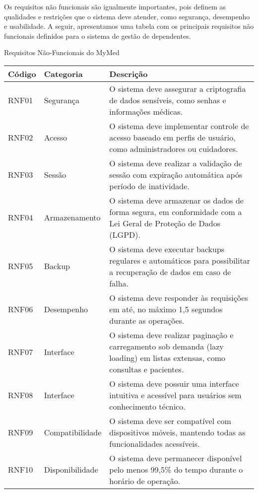 Os requisitos não funcionais são igualmente importantes, pois definem as qualidades e restrições que o sistema deve atender, como segurança, desempenho e usabilidade. A seguir, apresentamos uma tabela com os principais requisitos não funcionais definidos para o sistema de gestão de dependentes.

\begin{quadro}
\caption{Requisitos Não-Funcionais do MyMed}
\begin{tabularx}{\textwidth}{|l|l|X|}
\hline
\textbf{Código} & \textbf{Categoria} & \textbf{Descrição} \\ \hline
RNF01 & Segurança & O sistema deve assegurar a criptografia de dados sensíveis, como senhas e informações médicas. \\ \hline
RNF02 & Acesso & O sistema deve implementar controle de acesso baseado em perfis de usuário, como administradores ou cuidadores. \\ \hline
RNF03 & Sessão & O sistema deve realizar a validação de sessão com expiração automática após período de inatividade. \\ \hline
RNF04 & Armazenamento & O sistema deve armazenar os dados de forma segura, em conformidade com a Lei Geral de Proteção de Dados (LGPD). \\ \hline
RNF05 & Backup & O sistema deve executar backups regulares e automáticos para possibilitar a recuperação de dados em caso de falha. \\ \hline
RNF06 & Desempenho & O sistema deve responder às requisições em até, no máximo 1,5 segundos durante as operações. \\ \hline
RNF07 & Interface & O sistema deve realizar paginação e carregamento sob demanda (lazy loading) em listas extensas, como consultas e pacientes. \\ \hline
RNF08 & Interface & O sistema deve possuir uma interface intuitiva e acessível para usuários sem conhecimento técnico. \\ \hline
RNF09 & Compatibilidade & O sistema deve ser compatível com dispositivos móveis, mantendo todas as funcionalidades acessíveis. \\ \hline
RNF10 & Disponibilidade & O sistema deve permanecer disponível pelo menos 99,5\% do tempo durante o horário de operação. \\ \hline
\end{tabularx}
\end{quadro}